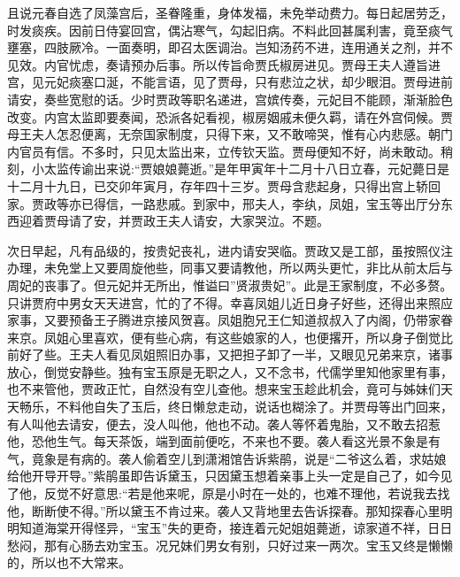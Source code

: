 \begin{parag}
    且说元春自选了凤藻宫后，圣眷隆重，身体发福，未免举动费力。每日起居劳乏，时发痰疾。因前日侍宴回宫，偶沾寒气，勾起旧病。不料此回甚属利害，竟至痰气壅塞，四肢厥冷。一面奏明，即召太医调治。岂知汤药不进，连用通关之剂，并不见效。内官忧虑，奏请预办后事。所以传旨命贾氏椒房进见。贾母王夫人遵旨进宫，见元妃痰塞口涎，不能言语，见了贾母，只有悲泣之状，却少眼泪。贾母进前请安，奏些宽慰的话。少时贾政等职名递进，宫嫔传奏，元妃目不能顾，渐渐脸色改变。内宫太监即要奏闻，恐派各妃看视，椒房姻戚未便久羁，请在外宫伺候。贾母王夫人怎忍便离，无奈国家制度，只得下来，又不敢啼哭，惟有心内悲感。朝门内官员有信。不多时，只见太监出来，立传钦天监。贾母便知不好，尚未敢动。稍刻，小太监传谕出来说:“贾娘娘薨逝。”是年甲寅年十二月十八日立春，元妃薨日是十二月十九日，已交卯年寅月，存年四十三岁。贾母含悲起身，只得出宫上轿回家。贾政等亦已得信，一路悲戚。到家中，邢夫人，李纨，凤姐，宝玉等出厅分东西迎着贾母请了安，并贾政王夫人请安，大家哭泣。不题。
\end{parag}


\begin{parag}
    次日早起，凡有品级的，按贵妃丧礼，进内请安哭临。贾政又是工部，虽按照仪注办理，未免堂上又要周旋他些，同事又要请教他，所以两头更忙，非比从前太后与周妃的丧事了。但元妃并无所出，惟谥曰”贤淑贵妃”。此是王家制度，不必多赘。只讲贾府中男女天天进宫，忙的了不得。幸喜凤姐儿近日身子好些，还得出来照应家事，又要预备王子腾进京接风贺喜。凤姐胞兄王仁知道叔叔入了内阁，仍带家眷来京。凤姐心里喜欢，便有些心病，有这些娘家的人，也便撂开，所以身子倒觉比前好了些。王夫人看见凤姐照旧办事，又把担子卸了一半，又眼见兄弟来京，诸事放心，倒觉安静些。独有宝玉原是无职之人，又不念书，代儒学里知他家里有事，也不来管他，贾政正忙，自然没有空儿查他。想来宝玉趁此机会，竟可与姊妹们天天畅乐，不料他自失了玉后，终日懒怠走动，说话也糊涂了。并贾母等出门回来，有人叫他去请安，便去，没人叫他，他也不动。袭人等怀着鬼胎，又不敢去招惹他，恐他生气。每天茶饭，端到面前便吃，不来也不要。袭人看这光景不象是有气，竟象是有病的。袭人偷着空儿到潇湘馆告诉紫鹃，说是“二爷这么着，求姑娘给他开导开导。”紫鹃虽即告诉黛玉，只因黛玉想着亲事上头一定是自己了，如今见了他，反觉不好意思:“若是他来呢，原是小时在一处的，也难不理他，若说我去找他，断断使不得。”所以黛玉不肯过来。袭人又背地里去告诉探春。那知探春心里明明知道海棠开得怪异，“宝玉”失的更奇，接连着元妃姐姐薨逝，谅家道不祥，日日愁闷，那有心肠去劝宝玉。况兄妹们男女有别，只好过来一两次。宝玉又终是懒懒的，所以也不大常来。
\end{parag}


